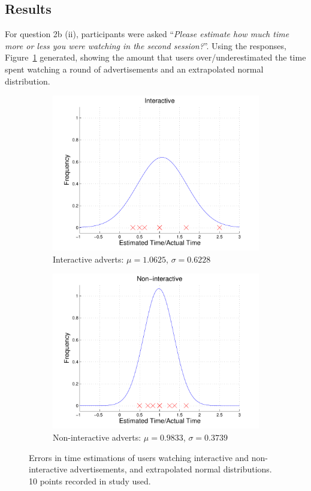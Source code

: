 	\subsection{Results}

	For question 2b (ii), participants were asked ``\textit{Please estimate how much time more or less you were watching in the second session?}''. Using the responses, Figure~\ref{fig:time_perception} generated, showing the amount that users over/underestimated the time spent watching a round of advertisements and an extrapolated normal distribution.
	\begin{figure}[h!]
		\centering
		\begin{subfigure}[h]{0.49\textwidth}
			\centering
			\includegraphics[width=\textwidth]{images/interactive_bell.pdf}
			\caption{Interactive adverts: $\mu=1.0625$, $\sigma=0.6228$}
		\end{subfigure}
		\begin{subfigure}[h]{0.49\textwidth}
			\centering
			\includegraphics[width=\textwidth]{images/noninteractive_bell.pdf}
			\caption{Non-interactive adverts: $\mu=0.9833$, $\sigma=0.3739$}
		\end{subfigure}
		\caption{Errors in time estimations of users watching interactive and non-interactive advertisements, and extrapolated normal distributions. 10 points recorded in study used.}
		\label{fig:time_perception}
	\end{figure}
